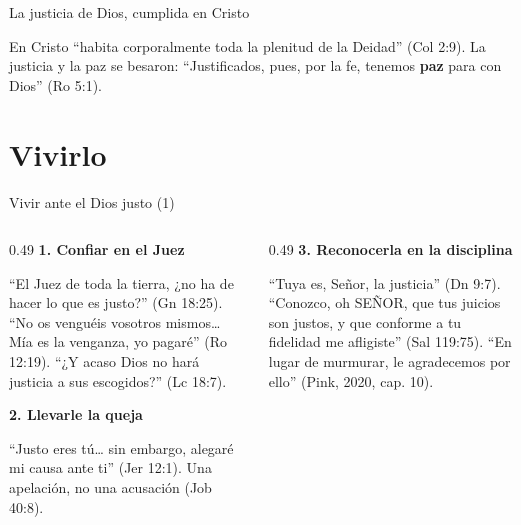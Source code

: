 \documentclass[hyperref={bookmarks=false},aspectratio=169]{beamer}
\newcommand{\SENOR}{S{\fontsize{0.78em}{1em}\selectfont EÑOR}}
\newcommand{\destacar}[1]{\textbf{\textcolor{azul}{#1}}}
\begin{document}
\begin{frame}{La justicia de Dios, cumplida en Cristo}
\centering
{}\par\bigskip
\small En Cristo ``habita corporalmente toda la plenitud de la Deidad'' (Col 2:9). La justicia y la paz se besaron: ``Justificados, pues, por la fe, tenemos \destacar{paz} para con Dios'' (Ro 5:1).
\end{frame}

\section{Vivirlo}

\begin{frame}{Vivir ante el Dios justo (1)}
\begin{columns}[t,onlytextwidth]
\begin{column}{0.49\textwidth}
\textbf{\color{azul}1. Confiar en el Juez}\par\small
``El Juez de toda la tierra, ¿no ha de hacer lo que es justo?'' (Gn 18:25). ``No os venguéis vosotros mismos\ldots{} Mía es la venganza, yo pagaré'' (Ro 12:19). ``¿Y acaso Dios no hará justicia a sus escogidos?'' (Lc 18:7).\par\medskip
\textbf{\color{azul}2. Llevarle la queja}\par\small
``Justo eres tú\ldots{} sin embargo, alegaré mi causa ante ti'' (Jer 12:1). Una apelación, no una acusación (Job 40:8).
\end{column}
\begin{column}{0.49\textwidth}
\textbf{\color{azul}3. Reconocerla en la disciplina}\par\small
``Tuya es, Señor, la justicia'' (Dn 9:7). ``Conozco, oh \SENOR, que tus juicios son justos, y que conforme a tu fidelidad me afligiste'' (Sal 119:75). ``En lugar de murmurar, le agradecemos por ello'' (Pink, 2020, cap. 10).
\end{column}
\end{columns}
\end{frame}
\end{document}
